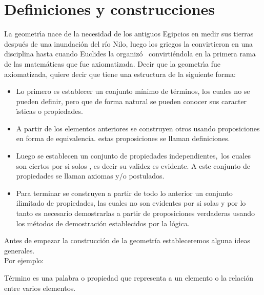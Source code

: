 \chapter[
     image=cap3,%
     image caption={The global option open right, triggers the typesetting of chapter on odd pages only. There are a  couple of layouts that must be typeset on an even pages.}]%
{Definiciones y construcciones}
{\hspace*{20pt} La geometr\'{\i}a nace de la necesidad de los antiguos Egipcios en medir sus
tierras despu\'{e}s de una inundaci\'{o}n del río Nilo, luego los griegos la
convirtieron en una disciplina hasta cuando Euclides la organiz\'{o} \
convirtiéndola en la primera rama de las matem\'{a}ticas que fue
axiomatizada.
Decir que la geometr\'{\i}a fue axiomatizada, quiere decir que tiene una
estructura de la siguiente forma:

\begin{itemize}
\item Lo primero es establecer un conjunto mínimo de t\'{e}rminos, los cuales no se
pueden definir, pero que de forma natural se pueden conocer sus caracter%
\'{\i}sticas o propiedades.

\item A partir de los elementos anteriores se construyen otros usando
proposiciones en forma de equivalencia. estas proposiciones se llaman
definiciones.

\item Luego se establecen un conjunto de propiedades independientes,\ los cuales son
ciertos por si solos , es decir su validez es evidente. A este conjunto de
propiedades se llaman axiomas y/o postulados.

\item Para terminar se construyen a partir de todo lo anterior un conjunto
ilimitado de propiedades, las cuales no son evidentes por si solas y por lo
tanto es necesario demostrarlas a partir de proposiciones verdaderas usando
los m\'{e}todos de demostraci\'{o}n establecidos por la lógica.
\end{itemize}
  }
\label{chap:1}
\label{sec:1.1}
 Antes de empezar la construcción de la geometría estableceremos alguna ideas generales.\\
Por ejemplo:
\begin{ideas}{Término es una palabra o propiedad que representa a un elemento o la relación entre varios elementos. }{}
\end{ideas}


